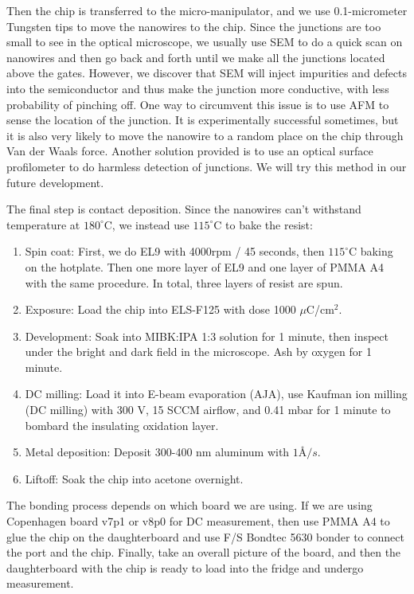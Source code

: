 Then the chip is transferred to the micro-manipulator, and we use 0.1-micrometer Tungsten tips to move the nanowires to the chip. Since the junctions are too small to see in the optical microscope, we usually use SEM to do a quick scan on nanowires and then go back and forth until we make all the junctions located above the gates. However, we discover that SEM will inject impurities and defects into the semiconductor and thus make the junction more conductive, with less probability of pinching off. One way to circumvent this issue is to use AFM to sense the location of the junction. It is experimentally successful sometimes, but it is also very likely to move the nanowire to a random place on the chip through Van der Waals force. Another solution provided is to use an optical surface profilometer to do harmless detection of junctions. We will try this method in our future development.

The final step is contact deposition. Since the nanowires can't withstand temperature at $180^\circ$C, we instead use $115^\circ$C to bake the resist:
\begin{enumerate}
    \item Spin coat: First, we do EL9 with 4000rpm / 45 seconds, then $115^\circ$C baking on the hotplate. Then one more layer of EL9 and one layer of PMMA A4 with the same procedure. In total, three layers of resist are spun.
    \item Exposure: Load the chip into ELS-F125 with dose 1000 $\mu$C/cm$^2$.
    \item Development: Soak into MIBK:IPA 1:3 solution for 1 minute, then inspect under the bright and dark field in the microscope. Ash by oxygen for 1 minute.
    \item DC milling: Load it into E-beam evaporation (AJA), use Kaufman ion milling (DC milling) with 300 V, 15 SCCM airflow, and 0.41 mbar for 1 minute to bombard the insulating oxidation layer.
    \item Metal deposition: Deposit 300-400 nm aluminum with $1 \text{\AA} / s$.
    \item Liftoff: Soak the chip into acetone overnight. 
\end{enumerate}

The bonding process depends on which board we are using. If we are using Copenhagen board v7p1 or v8p0 for DC measurement, then use PMMA A4 to glue the chip on the daughterboard and use F/S Bondtec 5630 bonder to connect the port and the chip. Finally, take an overall picture of the board, and then the daughterboard with the chip is ready to load into the fridge and undergo measurement.


